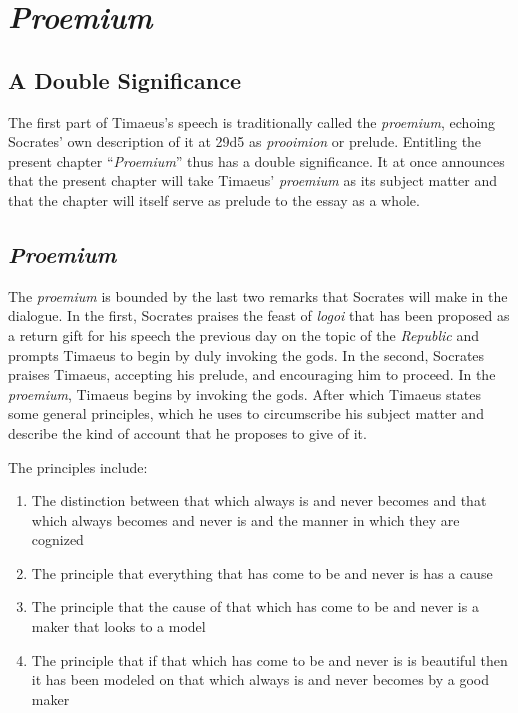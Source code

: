 
\chapter{\emph{Proemium}} %
\label{cha:proemium}

\section{A Double Significance} %
\label{sec:a_double_significance}

The first part of Timaeus's speech is traditionally called the \emph{proemium}, echoing Socrates' own description of it at 29d5 as \emph{prooimion} or prelude. Entitling the present chapter ``\emph{Proemium}'' thus has a double significance. It at once announces that the present chapter will take Timaeus' \emph{proemium} as its subject matter and that the chapter will itself serve as prelude to the essay as a whole.



\section{\emph{Proemium}} %
\label{sec:proemium}

The \emph{proemium} is bounded by the last two remarks that Socrates will make in the dialogue. In the first, Socrates praises the feast of \emph{logoi} that has been proposed as a return gift for his speech the previous day on the topic of the \emph{Republic} and prompts Timaeus to begin by duly invoking the gods. In the second, Socrates praises Timaeus, accepting his prelude, and encouraging him to proceed. In the \emph{proemium}, Timaeus begins by invoking the gods. After which Timaeus states some general principles, which he uses to circumscribe his subject matter and describe the kind of account that he proposes to give of it. 

The principles include:
\begin{enumerate}[(1)]
	\item The distinction between that which always is and never becomes and that which always becomes and never is and the manner in which they are cognized
	\item The principle that everything that has come to be and never is has a cause
	\item The principle that the cause of that which has come to be and never is a maker that looks to a model
	\item The principle that if that which has come to be and never is is beautiful then it has been modeled on that which always is and never becomes by a good maker
\end{enumerate}

